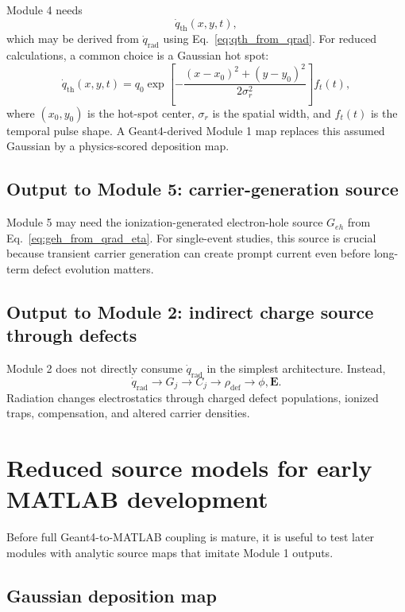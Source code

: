\documentclass[11pt]{article}
\newcommand{\qrad}{\dot{q}_{\mathrm{rad}}}
\newcommand{\qth}{\dot{q}_{\mathrm{th}}}
\newcommand{\Efield}{\mathbf{E}}
\newcommand{\Geh}{G_{eh}}
\begin{document}
Module 4 needs
\begin{equation}
\qth(x,y,t),
\end{equation}
which may be derived from $\qrad$ using Eq.~\eqref{eq:qth_from_qrad}. For reduced calculations, a common choice is a Gaussian hot spot:
\begin{equation}
\qth(x,y,t)
=
q_0
\exp\left[-\frac{(x-x_0)^2+(y-y_0)^2}{2\sigma_r^2}\right]
 f_t(t),
\end{equation}
where $(x_0,y_0)$ is the hot-spot center, $\sigma_r$ is the spatial width, and $f_t(t)$ is the temporal pulse shape. A Geant4-derived Module 1 map replaces this assumed Gaussian by a physics-scored deposition map.

\subsection{Output to Module 5: carrier-generation source}

Module 5 may need the ionization-generated electron-hole source $\Geh$ from Eq.~\eqref{eq:geh_from_qrad_eta}. For single-event studies, this source is crucial because transient carrier generation can create prompt current even before long-term defect evolution matters.

\subsection{Output to Module 2: indirect charge source through defects}

Module 2 does not directly consume $\qrad$ in the simplest architecture. Instead,
\begin{equation}
\qrad \longrightarrow G_j \longrightarrow C_j \longrightarrow \rho_{\mathrm{def}} \longrightarrow \phi,\Efield.
\end{equation}
Radiation changes electrostatics through charged defect populations, ionized traps, compensation, and altered carrier densities.

\section{Reduced source models for early MATLAB development}

Before full Geant4-to-MATLAB coupling is mature, it is useful to test later modules with analytic source maps that imitate Module 1 outputs.

\subsection{Gaussian deposition map}
\end{document}
